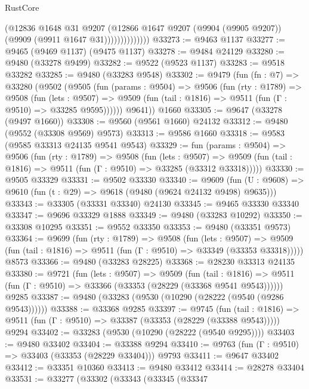 \begin{lexlean}{RustCore}
\begin{coremodule}
                        (@12836
                          @1648
                          @31
                          @9207
                          (@12866
                            @1647
                            @9207
                            (@9904 (@9905 @9207))
                            (@9909 (@9911 @1647 @31))))))))))))))
@33273 := @9463 @1137
@33277 := @9465 (@9469 @1137) (@9475 @1137)
@33278 := @9484 @24129
@33280 := @9480 (@33278 @9499)
@33282 := @9522 (@9523 @1137)
@33283 := @9518 @33282
@33285 := @9480 (@33283 @9548)
@33302 := @9479
    (fun (fn : @7) =>
    @33280
      (@9502
        (@9505
          (fun (params : @9504) =>
          @9506
            (fun (rty : @1789) =>
            @9508
              (fun (lets : @9507) =>
              @9509 (fun (tail : @1816) => @9511 (fun (Γ : @9510) => @33285 @9595))))))
        @9641))
    @1660
@33305 := @9647 (@33278 (@9497 @1660))
@33308 := @9560 (@9561 @1660) @24132
@33312 := @9480 (@9552 (@33308 @9569) @9573)
@33313 := @9586 @1660
@33318 := @9583 (@9585 @33313 @24135 @9541 @9543)
@33329 := fun (params : @9504) =>
  @9506
    (fun (rty : @1789) =>
    @9508
      (fun (lets : @9507) =>
      @9509 (fun (tail : @1816) => @9511 (fun (Γ : @9510) => @33285 (@33312 @33318)))))
@33330 := @9505 @33329
@33331 := @9502 @33330
@33340 := @9609
    (fun (U : @9608) => @9610 (fun (t : @29) => @9618 (@9480 (@9624 @24132 @9498) @9635)))
@33343 := @33305 (@33331 @33340) @24130
@33345 := @9465 @33330 @33340
@33347 := @9696 @33329 @1888
@33349 := @9480 (@33283 @10292)
@33350 := @33308 @10295
@33351 := @9552 @33350
@33353 := @9480 (@33351 @9573)
@33364 := @9699
    (fun (rty : @1789) =>
    @9508
      (fun (lets : @9507) =>
      @9509 (fun (tail : @1816) => @9511 (fun (Γ : @9510) => @33349 (@33353 @33318)))))
    @8573
@33366 := @9480 (@33283 @28225)
@33368 := @28230 @33313 @24135
@33380 := @9721
    (fun (lets : @9507) =>
    @9509
      (fun (tail : @1816) =>
      @9511 (fun (Γ : @9510) => @33366 (@33353 (@28229 (@33368 @9541 @9543))))))
    @9285
@33387 := @9480 (@33283 (@9530 (@10290 (@28222 (@9540 (@9286 @9543))))))
@33388 := @33368 @9285
@33397 := @9745
    (fun (tail : @1816) => @9511 (fun (Γ : @9510) => @33387 (@33353 (@28229 (@33388 @9543)))))
    @9294
@33402 := @33283 (@9530 (@10290 (@28222 (@9540 @9295))))
@33403 := @9480 @33402
@33404 := @33388 @9294
@33410 := @9763 (fun (Γ : @9510) => @33403 (@33353 (@28229 @33404))) @9793
@33411 := @9647 @33402
@33412 := @33351 @10360
@33413 := @9480 @33412
@33414 := @28278 @33404
@33531 := @33277
    (@33302
      (@33343
        (@33345
          (@33347

\end{coremodule}
\end{lexlean}
